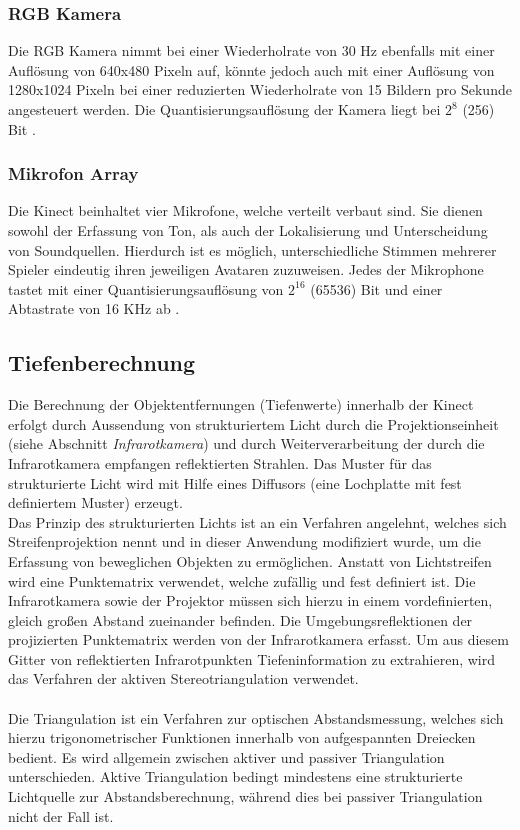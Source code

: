 \subsubsection{RGB Kamera}
Die RGB Kamera nimmt bei einer Wiederholrate von 30 Hz ebenfalls mit einer Auflösung von 640x480 Pixeln auf, könnte jedoch auch mit einer Auflösung von 1280x1024 Pixeln bei einer reduzierten Wiederholrate von 15 Bildern pro Sekunde angesteuert werden.
Die Quantisierungsauflösung der Kamera liegt bei $2^{8}$ (256) Bit \cite{microsoftdocu}. 
\subsubsection{Mikrofon Array}
Die Kinect beinhaltet vier Mikrofone, welche verteilt verbaut sind. Sie dienen sowohl der Erfassung von Ton, als auch der Lokalisierung und Unterscheidung von Soundquellen. Hierdurch ist es möglich, unterschiedliche Stimmen mehrerer Spieler eindeutig ihren jeweiligen Avataren zuzuweisen. Jedes der Mikrophone tastet mit einer Quantisierungsauflösung von $2^{16}$ (65536) Bit und einer Abtastrate von 16 KHz ab \cite{microsoftdocu}.
\subsection{Tiefenberechnung}
Die Berechnung der Objektentfernungen (Tiefenwerte) innerhalb der Kinect erfolgt durch Aussendung von strukturiertem Licht durch die Projektionseinheit (siehe Abschnitt \emph{Infrarotkamera}) und durch Weiterverarbeitung der durch die Infrarotkamera empfangen reflektierten Strahlen. Das Muster für das strukturierte Licht wird mit Hilfe eines Diffusors (eine Lochplatte mit fest definiertem Muster) erzeugt.\\
Das Prinzip des strukturierten Lichts ist an ein Verfahren angelehnt, welches sich Streifenprojektion nennt und in dieser Anwendung modifiziert wurde, um die Erfassung von beweglichen Objekten zu ermöglichen. Anstatt von Lichtstreifen wird eine Punktematrix verwendet, welche zufällig und fest definiert ist. Die Infrarotkamera sowie der Projektor müssen sich hierzu in einem vordefinierten, gleich großen Abstand zueinander befinden.
Die Umgebungsreflektionen der projizierten Punktematrix werden von der Infrarotkamera erfasst.
Um aus diesem Gitter von reflektierten Infrarotpunkten Tiefeninformation zu extrahieren, wird das Verfahren der aktiven Stereotriangulation verwendet.\\\\
Die Triangulation ist ein Verfahren zur optischen Abstandsmessung, welches sich hierzu trigonometrischer Funktionen innerhalb von aufgespannten Dreiecken bedient. 
Es wird allgemein zwischen aktiver und passiver Triangulation unterschieden.
Aktive Triangulation bedingt mindestens eine strukturierte Lichtquelle zur Abstandsberechnung, während dies bei passiver Triangulation nicht der Fall ist\cite{primesense}.\\


